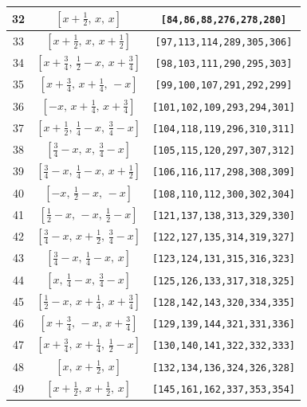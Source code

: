 \documentclass[fleqn,8pt]{jsarticle}
\begin{document}
\begin{longtable}{ccc}
32 & $\left[ x + \frac{1}{2},\, x,\, x \right]$ & {\tt [84,86,88,276,278,280]} \\ \hline
33 & $\left[ x + \frac{1}{2},\, x,\, x + \frac{1}{2} \right]$ & {\tt [97,113,114,289,305,306]} \\ \hline
34 & $\left[ x + \frac{3}{4},\, \frac{1}{2} - x,\, x + \frac{3}{4} \right]$ & {\tt [98,103,111,290,295,303]} \\ \hline
35 & $\left[ x + \frac{3}{4},\, x + \frac{1}{4},\, - x \right]$ & {\tt [99,100,107,291,292,299]} \\ \hline
36 & $\left[ - x,\, x + \frac{1}{4},\, x + \frac{3}{4} \right]$ & {\tt [101,102,109,293,294,301]} \\ \hline
37 & $\left[ x + \frac{1}{2},\, \frac{1}{4} - x,\, \frac{3}{4} - x \right]$ & {\tt [104,118,119,296,310,311]} \\ \hline
38 & $\left[ \frac{3}{4} - x,\, x,\, \frac{3}{4} - x \right]$ & {\tt [105,115,120,297,307,312]} \\ \hline
39 & $\left[ \frac{3}{4} - x,\, \frac{1}{4} - x,\, x + \frac{1}{2} \right]$ & {\tt [106,116,117,298,308,309]} \\ \hline
40 & $\left[ - x,\, \frac{1}{2} - x,\, - x \right]$ & {\tt [108,110,112,300,302,304]} \\ \hline
41 & $\left[ \frac{1}{2} - x,\, - x,\, \frac{1}{2} - x \right]$ & {\tt [121,137,138,313,329,330]} \\ \hline
42 & $\left[ \frac{3}{4} - x,\, x + \frac{1}{2},\, \frac{3}{4} - x \right]$ & {\tt [122,127,135,314,319,327]} \\ \hline
43 & $\left[ \frac{3}{4} - x,\, \frac{1}{4} - x,\, x \right]$ & {\tt [123,124,131,315,316,323]} \\ \hline
44 & $\left[ x,\, \frac{1}{4} - x,\, \frac{3}{4} - x \right]$ & {\tt [125,126,133,317,318,325]} \\ \hline
45 & $\left[ \frac{1}{2} - x,\, x + \frac{1}{4},\, x + \frac{3}{4} \right]$ & {\tt [128,142,143,320,334,335]} \\ \hline
46 & $\left[ x + \frac{3}{4},\, - x,\, x + \frac{3}{4} \right]$ & {\tt [129,139,144,321,331,336]} \\ \hline
47 & $\left[ x + \frac{3}{4},\, x + \frac{1}{4},\, \frac{1}{2} - x \right]$ & {\tt [130,140,141,322,332,333]} \\ \hline
48 & $\left[ x,\, x + \frac{1}{2},\, x \right]$ & {\tt [132,134,136,324,326,328]} \\ \hline
49 & $\left[ x + \frac{1}{2},\, x + \frac{1}{2},\, x \right]$ & {\tt [145,161,162,337,353,354]} \\ \hline

\end{longtable}
\end{document}
